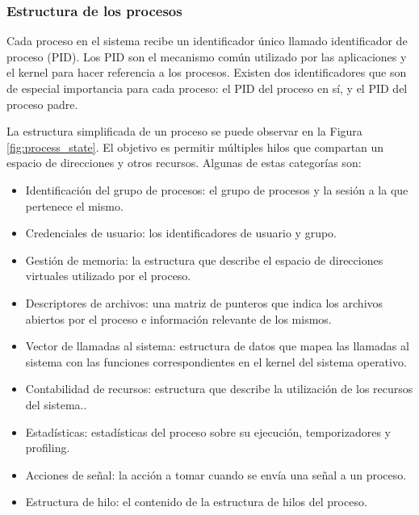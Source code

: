\subsubsection{Estructura de los procesos}
Cada proceso en el sistema recibe un identificador único llamado identificador de proceso (PID). Los PID son el mecanismo común utilizado por las aplicaciones y el kernel para hacer referencia a los procesos. Existen dos identificadores que son de especial importancia para cada proceso: el PID del proceso en sí, y el PID del proceso padre.\par

La estructura simplificada de un proceso se puede observar en la Figura \ref{fig:process_state}. El objetivo es permitir múltiples hilos que compartan un espacio de direcciones y otros recursos.  Algunas de estas categorías son:\par

\begin{itemize}
    \item Identificación del grupo de procesos: el grupo de procesos y la sesión a la que pertenece el mismo.
    \item Credenciales de usuario: los identificadores de usuario y grupo.
    \item Gestión de memoria: la estructura que describe el espacio de direcciones virtuales utilizado por el proceso.
    \item Descriptores de archivos: una matriz de punteros que indica los archivos abiertos por el proceso e información relevante de los mismos.
    \item Vector de llamadas al sistema: estructura de datos que mapea las llamadas al sistema con las funciones correspondientes en el kernel del sistema operativo.
    \item Contabilidad de recursos: estructura que describe la utilización de los recursos del sistema..
    \item Estadísticas: estadísticas del proceso sobre su ejecución, temporizadores y profiling.
    \item Acciones de señal: la acción a tomar cuando se envía una señal a un proceso.
    \item Estructura de hilo: el contenido de la estructura de hilos del proceso.
\end{itemize}


